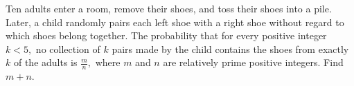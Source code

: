 Ten adults enter a room, remove their shoes, and toss their shoes into a pile. Later, a child randomly pairs each left shoe with a right shoe without regard to which shoes belong together. The probability that for every positive integer $k<5,$ no collection of $k$ pairs made by the child contains the shoes from exactly $k$ of the adults is $\tfrac{m}{n},$ where $m$ and $n$ are relatively prime positive integers. Find $m+n$.